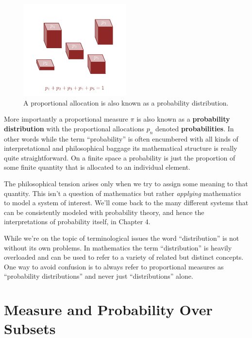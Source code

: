 \documentclass[
  letterpaper,
  DIV=11,
  numbers=noendperiod]{scrartcl}
\begin{document}
\begin{figure}

{\centering \includegraphics[width=0.5\textwidth,height=\textheight]{figures/probability_distribution/probability_distribution.pdf}

}

\caption{\label{fig-probability}A proportional allocation is also known
as a probability distribution.}

\end{figure}

More importantly a proportional measure \(\pi\) is also known as a
\textbf{probability distribution} with the proportional allocations
\(p_{n}\) denoted \textbf{probabilities}. In other words while the term
``probability'' is often encumbered with all kinds of interpretational
and philosophical baggage its mathematical structure is really quite
straightforward. On a finite space a probability is just the proportion
of some finite quantity that is allocated to an individual element.

The philosophical tension arises only when we try to assign some meaning
to that quantity. This isn't a question of mathematics but rather
\emph{applying} mathematics to model a system of interest. We'll come
back to the many different systems that can be consistently modeled with
probability theory, and hence the interpretations of probability itself,
in Chapter 4.

While we're on the topic of terminological issues the word
``distribution'' is not without its own problems. In mathematics the
term ``distribution'' is heavily overloaded and can be used to refer to
a variety of related but distinct concepts. One way to avoid confusion
is to always refer to proportional measures as ``probability
distributions'' and never just ``distributions'' alone.

\hypertarget{measure-and-probability-over-subsets}{%
\section{Measure and Probability Over
Subsets}\label{measure-and-probability-over-subsets}}
\end{document}
